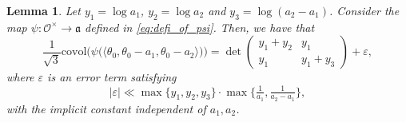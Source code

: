 \documentclass[11pt,letterpaper]{amsart}
\newtheorem{lem}[theorem]{Lemma}
\theoremstyle{definition}
\theoremstyle{remark}
\newcommand{\cal}[1]{\mathcal{#1}}
\newcommand{\calO}{\cal O}
\begin{document}
	
	\begin{lem}
		\label{le:regulator_of_units}
		Let 
		$y_1 = \log a_1$, $y_2 = \log a_2$ and $y_3 = \log ( a_2 - a_1 )$. Consider the map $\psi:\calO^{\times} \rightarrow \mathfrak{a}$ defined in  \cref{eq:defi_of_psi}. Then, we have that 
		\begin{equation}
			\frac{1}{\sqrt{3}}\mathrm{covol}\Big(\psi\big( \langle \theta_0, \theta_0-a_1 ,\theta_0-a_2\rangle \big)\Big) = 
			\det\left(  
			\begin{smallmatrix}
				y_1+y_2 & y_1 \\
				y_1 & y_1 +y_3
			\end{smallmatrix}  
			\right)
			+ \varepsilon,
		\end{equation}
		where $\varepsilon$ is an error term satisfying
		\begin{equation}
			| \varepsilon | \ll  \max\lbrace y_1,y_2,y_3\rbrace \cdot \max\Big\lbrace \tfrac{1}{a_1}, \tfrac{1}{a_2-a_1} \Big\rbrace,
			\label{eq:described_error}
		\end{equation}
		with the implicit constant independent of $a_1,a_2$.
	\end{lem}
\end{document}
